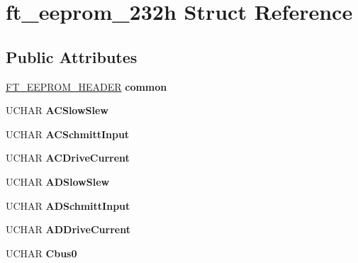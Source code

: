 \hypertarget{structft__eeprom__232h}{}\section{ft\+\_\+eeprom\+\_\+232h Struct Reference}
\label{structft__eeprom__232h}
\subsection*{Public Attributes}
\begin{DoxyCompactItemize}
\item 
\hyperlink{structft__eeprom__header}{F\+T\+\_\+\+E\+E\+P\+R\+O\+M\+\_\+\+H\+E\+A\+D\+ER} {\bfseries common}\hypertarget{structft__eeprom__232h_a37234d2dd02343759c92fd97e4835ccb}{}\label{structft__eeprom__232h_a37234d2dd02343759c92fd97e4835ccb}

\item 
U\+C\+H\+AR {\bfseries A\+C\+Slow\+Slew}\hypertarget{structft__eeprom__232h_a3cfbbe62de0029839534fb469a9b50c9}{}\label{structft__eeprom__232h_a3cfbbe62de0029839534fb469a9b50c9}

\item 
U\+C\+H\+AR {\bfseries A\+C\+Schmitt\+Input}\hypertarget{structft__eeprom__232h_a025e35a0ae019370a4ea968f1cc2df2b}{}\label{structft__eeprom__232h_a025e35a0ae019370a4ea968f1cc2df2b}

\item 
U\+C\+H\+AR {\bfseries A\+C\+Drive\+Current}\hypertarget{structft__eeprom__232h_a8cb3fbf23ced09e59165178aee3f3c57}{}\label{structft__eeprom__232h_a8cb3fbf23ced09e59165178aee3f3c57}

\item 
U\+C\+H\+AR {\bfseries A\+D\+Slow\+Slew}\hypertarget{structft__eeprom__232h_a192cf979058aac20dbea8840a35f1bae}{}\label{structft__eeprom__232h_a192cf979058aac20dbea8840a35f1bae}

\item 
U\+C\+H\+AR {\bfseries A\+D\+Schmitt\+Input}\hypertarget{structft__eeprom__232h_a9d6cc1ae3e56bad64ba55a3db9cd845c}{}\label{structft__eeprom__232h_a9d6cc1ae3e56bad64ba55a3db9cd845c}

\item 
U\+C\+H\+AR {\bfseries A\+D\+Drive\+Current}\hypertarget{structft__eeprom__232h_a6aa2aea692700ed5e98a958819db3944}{}\label{structft__eeprom__232h_a6aa2aea692700ed5e98a958819db3944}

\item 
U\+C\+H\+AR {\bfseries Cbus0}\hypertarget{structft__eeprom__232h_aac7c9328aa4b74813b1fbd73a0a6afbd}{}\label{structft__eeprom__232h_aac7c9328aa4b74813b1fbd73a0a6afbd}


\end{DoxyCompactItemize}

